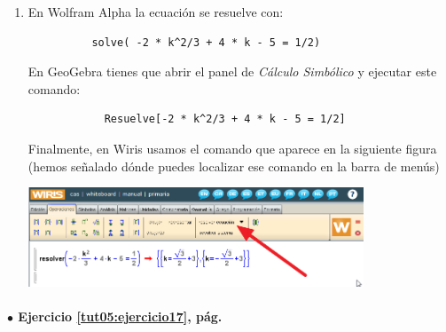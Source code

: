 \documentclass[10pt,a4paper]{article}\usepackage[]{graphicx}\usepackage[]{color}
\begin{document}
\begin{enumerate}
  \item En Wolfram Alpha la ecuación se resuelve con:
      \begin{center}
        \begin{verbatim}
          solve( -2 * k^2/3 + 4 * k - 5 = 1/2)
        \end{verbatim}
      \end{center}
      En GeoGebra tienes que abrir el panel de {\em Cálculo Simbólico} y ejecutar este comando:
        \begin{center}
          \begin{verbatim}
            Resuelve[-2 * k^2/3 + 4 * k - 5 = 1/2]
          \end{verbatim}
        \end{center}
        Finalmente, en Wiris usamos el comando que aparece en la siguiente figura (hemos señalado dónde puedes localizar ese comando en la barra de menús)
      \begin{center}
        \includegraphics[width=10cm]{../fig/Tut05-70.png}
      \end{center}





\end{enumerate}


\paragraph{\bf $\bullet$ Ejercicio \ref{tut05:ejercicio17}, pág. \pageref{tut05:ejercicio17}}
\label{tut05:ejercicio17:sol}\quad\\
\end{document}
